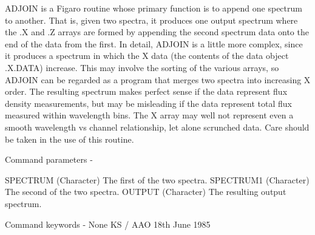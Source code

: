 \begin{description}
\begin{terminalv}
 ADJOIN is a Figaro routine whose primary function is to
 append one spectrum to another.  That is, given two spectra,
 it produces one output spectrum where the .X and .Z arrays
 are formed by appending the second spectrum data onto the end
 of the data from the first.  In detail, ADJOIN is a little
 more complex, since it produces a spectrum in which the
 X data (the contents of the data object .X.DATA) increase.
 This may involve the sorting of the various arrays, so ADJOIN
 can be regarded as a program that merges two spectra into
 increasing X order. The resulting spectrum makes perfect
 sense if the data represent flux density measurements, but
 may be misleading if the data represent total flux measured
 within wavelength bins.  The X array may well not represent
 even a smooth wavelength vs channel relationship, let alone
 scrunched data.  Care should be taken in the use of this routine.

 Command parameters -

 SPECTRUM    (Character) The first of the two spectra.
 SPECTRUM1   (Character) The second of the two spectra.
 OUTPUT      (Character) The resulting output spectrum.

 Command keywords - None
                                            KS  / AAO 18th June 1985
\end{terminalv}
\end{description}
